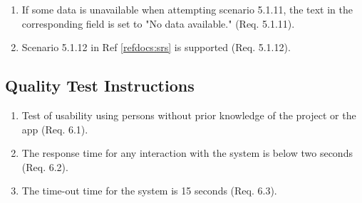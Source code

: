 \documentclass[a4paper]{article}
\newlength{\testlabellength}
\newenvironment{testlist}{\begin{enumerate}[label=\bfseries Instruction \thesubsection.\arabic* , labelindent=0pt, labelwidth=\testlabellength , leftmargin=2cm]}{\end{enumerate}}
\begin{document}
\begin{appendices}
\begin{testlist}
	\item If some data is unavailable when attempting scenario 5.1.11, the text in the corresponding field is set to "No data available." (Req. 5.1.11).
	
	\item Scenario 5.1.12 in Ref \ref{refdocs:srs} is supported (Req. 5.1.12).
\end{testlist}

\subsection{Quality Test Instructions}

\begin{testlist}
	\item Test of usability using persons without prior knowledge of the project or the app (Req. 6.1).
	
	\item The response time for any interaction with the system is below two seconds (Req. 6.2).
	
	\item The time-out time for the system is 15 seconds (Req. 6.3). 
	
\end{testlist}

\clearpage

\end{appendices}
\end{document}
